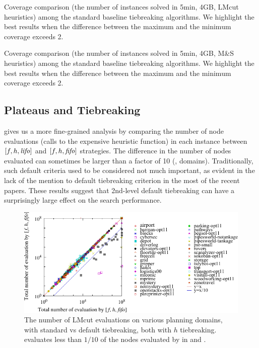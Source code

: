 \begin{table}[htbp]
 {
 \centering
 
 \caption{
 Coverage comparison (the number of instances solved in 5min, 4GB, LMcut
 heuristics) among
 the standard baseline tiebreaking algorithms. We highlight the
 best results when the difference between the maximum and the minimum coverage exceeds 2.
 }
 \label{tbl:lmcut-ipc-std}
 }
\end{table}

\begin{table}[htbp]
 {
 \centering
 
 \caption{
 Coverage comparison (the number of instances solved in 5min, 4GB, M\&S heuristics) among
 the standard baseline tiebreaking algorithms. We highlight the
 best results when the difference between the maximum and the minimum coverage exceeds 2.
 }
 \label{tbl:mands-ipc-std}
 }
\end{table}


\subsection{Plateaus and Tiebreaking}

 gives us a
more fine-grained analysis by comparing the number of node evaluations
(calls to the expensive \lmcut heuristic function) in each instance between $[f,h,{\text{\textit{lifo}}}]$ and $[f,h,{\text{\textit{fifo}}}]$ strategies.
The difference in the number of nodes
evaluated can sometimes be larger than a factor of 10 (,  domains).
Traditionally, such default criteria used to be considered not much important, as evident in the lack of the mention to default tiebreaking criterion in the most of the recent papers. 
These results suggest that 2nd-level default tiebreaking can have a surprisingly large effect on
the search performance.

\begin{figure}[htbp]
 \centering {}
 \includegraphics{tables/aaai16-30min-5min-cut/aaai16prelim3/evaluated-lmcut_ff-lmcut_lf.pdf}
 \caption{The number of LMcut evaluations on various planning domains,
 with standard \fifo vs \lifo default tiebreaking, both with $h$
 tiebreaking. \lifo evaluates  less than $1/10$ of the nodes evaluated
 by \fifo in  and . 
 }
 \label{fig:f-h-eval}
\end{figure}


